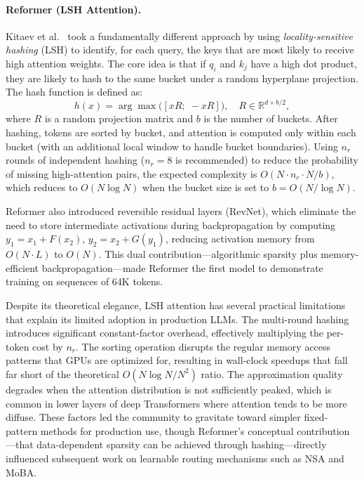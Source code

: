\paragraph{Reformer (LSH Attention).}
Kitaev et al.~\cite{kitaev2020reformer} took a fundamentally different approach by using \emph{locality-sensitive hashing} (LSH) to identify, for each query, the keys that are most likely to receive high attention weights. The core idea is that if $q_i$ and $k_j$ have a high dot product, they are likely to hash to the same bucket under a random hyperplane projection. The hash function is defined as:
\begin{equation}
h(x) = \arg\max\bigl([xR;\; -xR]\bigr), \quad R \in \mathbb{R}^{d \times b/2},
\label{eq:lsh-hash}
\end{equation}
where $R$ is a random projection matrix and $b$ is the number of buckets. After hashing, tokens are sorted by bucket, and attention is computed only within each bucket (with an additional local window to handle bucket boundaries). Using $n_r$ rounds of independent hashing ($n_r = 8$ is recommended) to reduce the probability of missing high-attention pairs, the expected complexity is $O(N \cdot n_r \cdot N/b)$, which reduces to $O(N \log N)$ when the bucket size is set to $b = O(N / \log N)$.

Reformer also introduced reversible residual layers (RevNet), which eliminate the need to store intermediate activations during backpropagation by computing $y_1 = x_1 + F(x_2)$, $y_2 = x_2 + G(y_1)$, reducing activation memory from $O(N \cdot L)$ to $O(N)$. This dual contribution---algorithmic sparsity plus memory-efficient backpropagation---made Reformer the first model to demonstrate training on sequences of 64K tokens.

Despite its theoretical elegance, LSH attention has several practical limitations that explain its limited adoption in production LLMs. The multi-round hashing introduces significant constant-factor overhead, effectively multiplying the per-token cost by $n_r$. The sorting operation disrupts the regular memory access patterns that GPUs are optimized for, resulting in wall-clock speedups that fall far short of the theoretical $O(N \log N / N^2)$ ratio. The approximation quality degrades when the attention distribution is not sufficiently peaked, which is common in lower layers of deep Transformers where attention tends to be more diffuse. These factors led the community to gravitate toward simpler fixed-pattern methods for production use, though Reformer's conceptual contribution---that data-dependent sparsity can be achieved through hashing---directly influenced subsequent work on learnable routing mechanisms such as NSA and MoBA.


